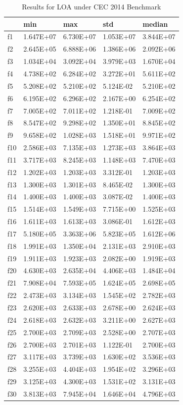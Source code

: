 \begin{table}[]
\begin{tabular}{lllll}
    & \textbf{min}       & \textbf{max}       & \textbf{std}       & \textbf{median}    \\ \hline
f1  & 1.647E+07 & 6.730E+07 & 1.053E+07 & 3.844E+07 \\
f2  & 2.645E+05 & 6.888E+06 & 1.386E+06 & 2.092E+06 \\
f3  & 1.034E+04 & 3.092E+04 & 3.979E+03 & 1.670E+04 \\
f4  & 4.738E+02 & 6.284E+02 & 3.272E+01 & 5.611E+02 \\
f5  & 5.208E+02 & 5.210E+02 & 5.124E-02 & 5.210E+02 \\
f6  & 6.195E+02 & 6.296E+02 & 2.167E+00 & 6.254E+02 \\
f7  & 7.005E+02 & 7.011E+02 & 1.218E-01 & 7.009E+02 \\
f8  & 8.547E+02 & 9.298E+02 & 1.350E+01 & 8.845E+02 \\
f9  & 9.658E+02 & 1.028E+03 & 1.518E+01 & 9.971E+02 \\
f10 & 2.586E+03 & 7.135E+03 & 1.273E+03 & 3.864E+03 \\
f11 & 3.717E+03 & 8.245E+03 & 1.148E+03 & 7.470E+03 \\
f12 & 1.202E+03 & 1.203E+03 & 3.312E-01 & 1.203E+03 \\
f13 & 1.300E+03 & 1.301E+03 & 8.465E-02 & 1.300E+03 \\
f14 & 1.400E+03 & 1.400E+03 & 3.087E-02 & 1.400E+03 \\
f15 & 1.514E+03 & 1.549E+03 & 7.715E+00 & 1.525E+03 \\
f16 & 1.611E+03 & 1.613E+03 & 3.086E-01 & 1.612E+03 \\
f17 & 5.180E+05 & 3.363E+06 & 5.823E+05 & 1.612E+06 \\
f18 & 1.991E+03 & 1.350E+04 & 2.131E+03 & 2.910E+03 \\
f19 & 1.911E+03 & 1.923E+03 & 2.082E+00 & 1.919E+03 \\
f20 & 4.630E+03 & 2.635E+04 & 4.406E+03 & 1.484E+04 \\
f21 & 7.908E+04 & 7.593E+05 & 1.624E+05 & 2.698E+05 \\
f22 & 2.473E+03 & 3.134E+03 & 1.545E+02 & 2.782E+03 \\
f23 & 2.620E+03 & 2.633E+03 & 2.678E+00 & 2.624E+03 \\
f24 & 2.618E+03 & 2.632E+03 & 3.211E+00 & 2.627E+03 \\
f25 & 2.700E+03 & 2.709E+03 & 2.528E+00 & 2.707E+03 \\
f26 & 2.700E+03 & 2.701E+03 & 1.122E-01 & 2.700E+03 \\
f27 & 3.117E+03 & 3.739E+03 & 1.630E+02 & 3.536E+03 \\
f28 & 3.255E+03 & 4.404E+03 & 1.954E+02 & 3.296E+03 \\
f29 & 3.125E+03 & 4.300E+03 & 1.531E+02 & 3.131E+03 \\
f30 & 3.813E+03 & 7.945E+04 & 1.646E+04 & 4.796E+03
\end{tabular}
\caption{Results for LOA under CEC 2014 Benchmark}
\end{table}

